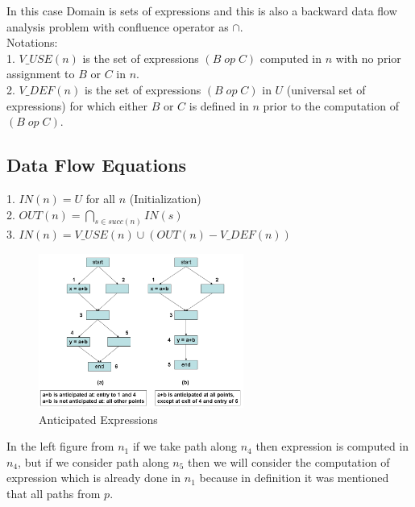 \documentclass{article}
\begin{document}
In this case Domain is sets of expressions and this is also a backward data flow analysis problem with confluence operator as $\cap$. \\

Notations: \\
1. $V\_USE(n)$ is the set of expressions $(B \; op \; C)$ computed in $n$ with no prior assignment to $B$ or $C$ in $n$. \\
2. $V\_DEF(n)$ is the set of expressions $(B \; op \; C)$ in $U$ (universal set of expressions) for which either $B$ or $C$ is defined in $n$ prior to the computation of $(B \; op \; C)$. \\

\subsection*{Data Flow Equations}
1. $IN(n) = U$ for all $n$ (Initialization) \\
2. $OUT(n) = \bigcap_{s \in succ(n)} IN(s)$ \\
3. $IN(n) = V\_USE(n) \cup (OUT(n) - V\_DEF(n))$ \\

\begin{figure}[h]
    \centering
    \includegraphics[width=0.6\textwidth]{Images/anticipated.png}
    \caption{Anticipated Expressions}
    \label{fig:AnticipatedExpressions}
\end{figure}
In the left figure from $n_1$ if we take path along $n_4$ then expression is computed in $n_4$, but if we consider path along $n_5$ then we will consider the computation of expression which is already done in $n_1$ because in definition it was mentioned that all paths from $p$. 
\end{document}
